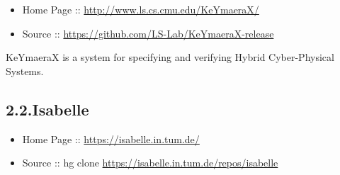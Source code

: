 \documentclass[12pt,twoside]{article}
\begin{document}
\begin{itemize}[noitemsep,topsep=\mdcompacttopsep]%

\item{}Home Page :: \href{http://www.ls.cs.cmu.edu/KeYmaeraX/}{{\ttfamily http://\hspace{0pt}www.\hspace{0pt}ls.\hspace{0pt}cs.\hspace{0pt}cmu.\hspace{0pt}edu/\hspace{0pt}KeYmaeraX/\hspace{0pt}}}%

\item{}Source :: \href{https://github.com/LS-Lab/KeYmaeraX-release}{{\ttfamily https://\hspace{0pt}github.\hspace{0pt}com/\hspace{0pt}LS-\hspace{0pt}Lab/\hspace{0pt}KeYmaeraX-\hspace{0pt}release}}%
\end{itemize}%

\noindent{}KeYmaeraX is a system for specifying and verifying Hybrid
Cyber-Physical Systems.%

\subsection{2.2.\hspace*{0.5em}Isabelle}\label{sec-isabelle}%

\begin{itemize}[noitemsep,topsep=\mdcompacttopsep]%

\item{}Home Page :: \href{https://isabelle.in.tum.de/}{{\ttfamily https://\hspace{0pt}isabelle.\hspace{0pt}in.\hspace{0pt}tum.\hspace{0pt}de/\hspace{0pt}}}%

\item{}Source :: hg clone \href{https://isabelle.in.tum.de/repos/isabelle}{{\ttfamily https://\hspace{0pt}isabelle.\hspace{0pt}in.\hspace{0pt}tum.\hspace{0pt}de/\hspace{0pt}repos/\hspace{0pt}isabelle}}%
\end{itemize}%
\end{document}
